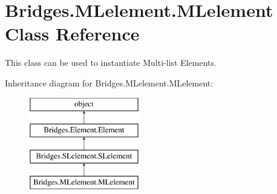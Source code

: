 \hypertarget{class_bridges_1_1_m_lelement_1_1_m_lelement}{}\section{Bridges.\+M\+Lelement.\+M\+Lelement Class Reference}
\label{class_bridges_1_1_m_lelement_1_1_m_lelement}


This class can be used to instantiate Multi-\/list Elements.  


Inheritance diagram for Bridges.\+M\+Lelement.\+M\+Lelement\+:\begin{figure}[H]
\begin{center}
\leavevmode
\includegraphics[height=4.000000cm]{class_bridges_1_1_m_lelement_1_1_m_lelement}
\end{center}
\end{figure}
